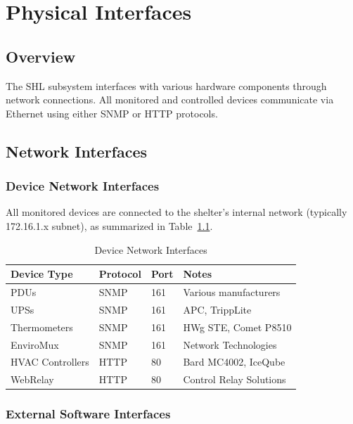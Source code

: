 
\chapter{Physical Interfaces}
\label{sec:physical}

\section{Overview}

The SHL subsystem interfaces with various hardware components through network connections. All monitored and controlled devices communicate via Ethernet using either SNMP or HTTP protocols.

\section{Network Interfaces}

\subsection{Device Network Interfaces}

All monitored devices are connected to the shelter's internal network (typically 172.16.1.x subnet), as summarized in Table~\ref{tab:device-interfaces}.

\begin{table}[h]
    \centering
    \begin{tabular}{llll}
        \toprule
        \textbf{Device Type} & \textbf{Protocol} & \textbf{Port} & \textbf{Notes} \\
        \midrule
        PDUs & SNMP & 161 & Various manufacturers \\
        UPSs & SNMP & 161 & APC, TrippLite \\
        Thermometers & SNMP & 161 & HWg STE, Comet P8510 \\
        EnviroMux & SNMP & 161 & Network Technologies \\
        HVAC Controllers & HTTP & 80 & Bard MC4002, IceQube \\
        WebRelay & HTTP & 80 & Control Relay Solutions \\
        \bottomrule
    \end{tabular}
    \caption{Device Network Interfaces}
    \label{tab:device-interfaces}
\end{table}

\subsection{External Software Interfaces}

